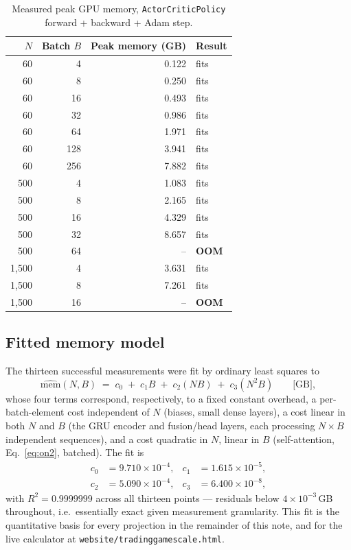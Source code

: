 \documentclass[11pt]{article}
\newcommand{\code}[1]{\texttt{#1}}
\begin{document}
\begin{table}[h!]
\centering
\caption{Measured peak GPU memory, \code{ActorCriticPolicy} forward + backward + Adam step.}
\label{tab:measurements}
\begin{tabular}{@{}rrrl@{}}
\toprule
$N$ & Batch $B$ & Peak memory (GB) & Result \\
\midrule
60    & 4   & 0.122 & fits \\
60    & 8   & 0.250 & fits \\
60    & 16  & 0.493 & fits \\
60    & 32  & 0.986 & fits \\
60    & 64  & 1.971 & fits \\
60    & 128 & 3.941 & fits \\
60    & 256 & 7.882 & fits \\
500   & 4   & 1.083 & fits \\
500   & 8   & 2.165 & fits \\
500   & 16  & 4.329 & fits \\
500   & 32  & 8.657 & fits \\
500   & 64  & --    & \textbf{OOM} \\
1{,}500 & 4 & 3.631 & fits \\
1{,}500 & 8 & 7.261 & fits \\
1{,}500 & 16 & --   & \textbf{OOM} \\
\bottomrule
\end{tabular}
\end{table}

\subsection{Fitted memory model}

The thirteen successful measurements were fit by ordinary least squares to
\begin{equation}
  \widehat{\mathrm{mem}}(N,B) \;=\; c_0 \;+\; c_1 B \;+\; c_2 (NB) \;+\; c_3 (N^2 B) \qquad \text{[GB]},
  \label{eq:fit}
\end{equation}
whose four terms correspond, respectively, to a fixed constant overhead, a
per-batch-element cost independent of $N$ (biases, small dense layers), a
cost linear in both $N$ and $B$ (the GRU encoder and fusion/head layers,
each processing $N{\times}B$ independent sequences), and a cost quadratic in
$N$, linear in $B$ (self-attention, Eq.~\eqref{eq:on2}, batched). The fit is
\begin{align}
  c_0 &= 9.710\times10^{-4}, &
  c_1 &= 1.615\times10^{-5}, \\
  c_2 &= 5.090\times10^{-4}, &
  c_3 &= 6.400\times10^{-8},
\end{align}
with $R^2 = 0.9999999$ across all thirteen points --- residuals below
$4\times10^{-3}$\,GB throughout, i.e.\ essentially exact given measurement
granularity. This fit is the quantitative basis for every projection in the
remainder of this note, and for the live calculator at
\texttt{website/tradinggamescale.html}.
\end{document}

